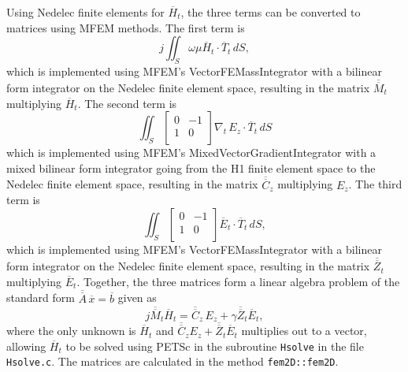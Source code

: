 \documentclass[titlepage]{article}
\renewcommand\_{\textunderscore\linebreak[1]}
\begin{document}
Using Nedelec finite elements for $\overline{H}_t$, the three terms can be converted to matrices using MFEM methods.  The first term is
\begin{equation}
j\iint_S \omega\mu\overline{H}_t \cdot \overline{T}_t \,dS,
\end{equation}
which is implemented using MFEM's VectorFEMassIntegrator with a bilinear form integrator on the Nedelec finite element space, resulting in the matrix $\overline{\overline{M}}_t$ multiplying $\overline{H}_t$.  The second term is 
\begin{equation}
\iint_S \left[ \begin{array}{cc}
  0 & -1 \\
  1 & 0 \\
\end{array} \right] \nabla_t \, E_z\cdot \overline{T}_t \,dS
\end{equation}
which is implemented using MFEM's MixedVectorGradientIntegrator with a mixed bilinear form integrator going from the H1 finite element space to the Nedelec finite element space, resulting in the matrix $\overline{\overline{C}}_z$ multiplying $E_z$.  The third term is 
\begin{equation}
\label{eq:Ht6}
\iint_S \left[ \begin{array}{cc}
  0 & -1 \\
  1 & 0 \\
\end{array} \right]\overline{E}_t \cdot \overline{T}_t \,dS,
\end{equation}
which is implemented using MFEM's VectorFEMassIntegrator with a bilinear form integrator on the Nedelec finite element space, resulting in the matrix $\overline{\overline{Z}}_t$ multiplying $\overline{E}_t$.
Together, the three matrices form a linear algebra problem of the standard form $\overline{\overline{A}}\,\overline{x}=\overline{b}$ given as
\begin{equation}
\label{eq:Htlinearalgebra}
j\overline{\overline{M}}_t \overline{H}_t = \overline{\overline{C}}_z \, E_z + \gamma\overline{\overline{Z}}_t \overline{E}_t,
\end{equation}
where the only unknown is $\overline{H}_t$ and $\overline{\overline{C}}_z E_z + \overline{\overline{Z}}_t \overline{E}_t$ multiplies out to a vector, allowing $\overline{H}_t$ to be solved using PETSc \cite{PETSc} in the subroutine \texttt{Hsolve} in the file \texttt{Hsolve.c}.  The matrices are calculated in the method \texttt{fem2D::fem2D}.
\end{document}
